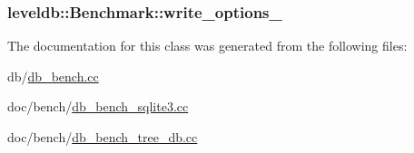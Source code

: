 \subsubsection[{write\+\_\+options\+\_\+}]{ leveldb\+::\+Benchmark\+::write\+\_\+options\+\_\+\hspace{0.3cm}{\ttfamily [private]}}\label{classleveldb_1_1_benchmark_a0e4811e2580f4777fc4a5c1abb855d62}


The documentation for this class was generated from the following files\+:\begin{DoxyCompactItemize}
\item 
db/\hyperlink{db__bench_8cc}{db\+\_\+bench.\+cc}\item 
doc/bench/\hyperlink{db__bench__sqlite3_8cc}{db\+\_\+bench\+\_\+sqlite3.\+cc}\item 
doc/bench/\hyperlink{db__bench__tree__db_8cc}{db\+\_\+bench\+\_\+tree\+\_\+db.\+cc}\end{DoxyCompactItemize}
